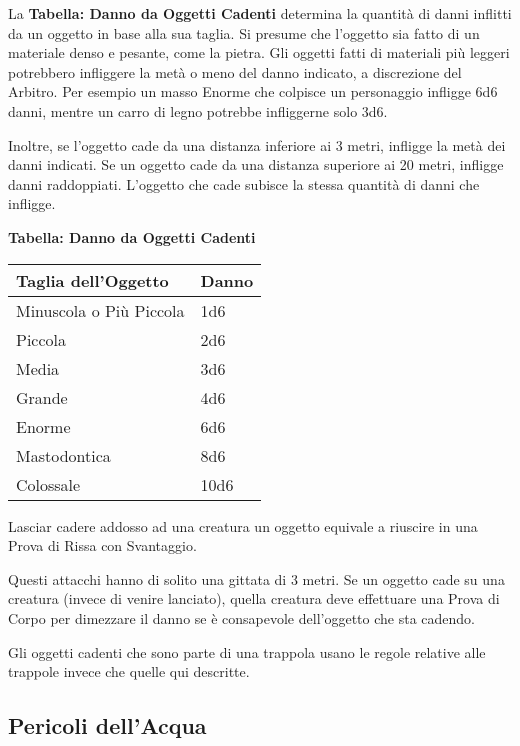 \documentclass[12pt,a4paper,twoside,openany]{book}
\begin{document}
\begin{multicols}{2}
La \textbf{Tabella: Danno da Oggetti Cadenti} determina la quantità di danni inflitti da un oggetto in base alla sua taglia. Si presume che l'oggetto sia fatto di un materiale denso e pesante, come la pietra.
Gli oggetti fatti di materiali più leggeri potrebbero infliggere la metà o meno del danno indicato, a discrezione del Arbitro. Per esempio un masso Enorme che colpisce un personaggio infligge 6d6 danni, mentre un carro di legno potrebbe infliggerne solo 3d6.

Inoltre, se l'oggetto cade da una distanza inferiore ai 3 metri, infligge la metà dei danni indicati. Se un oggetto cade da una distanza superiore ai 20 metri, infligge danni raddoppiati. L'oggetto che cade subisce la stessa quantità di danni che infligge.

\bigskip

\textbf{Tabella: Danno da Oggetti Cadenti}

\medskip

\begin{tabular}{ll}
\textbf{Taglia dell'Oggetto} & \textbf{Danno}\\
\toprule
Minuscola o Più Piccola  & 1d6\\
Piccola  & 2d6\\
Media  & 3d6\\
Grande & 4d6\\
Enorme & 6d6\\
Mastodontica & 8d6\\
Colossale  & 10d6\\
\end{tabular}

\bigskip

Lasciar cadere addosso ad una creatura un oggetto equivale a riuscire in una Prova di Rissa con Svantaggio. 

Questi attacchi hanno di solito una gittata di 3 metri. Se un oggetto cade su una creatura (invece di venire lanciato), quella creatura deve effettuare una Prova di Corpo per dimezzare il danno se è consapevole dell'oggetto che sta cadendo.

Gli oggetti cadenti che sono parte di una trappola usano le regole relative alle trappole invece che quelle qui descritte.

\subsection{Pericoli dell'Acqua}


\end{multicols}
\end{document}
